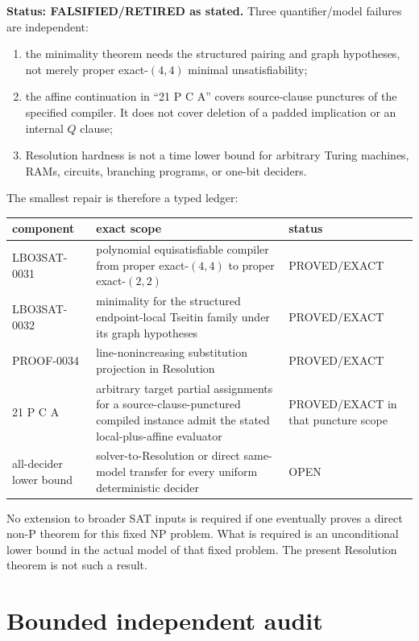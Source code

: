 \documentclass[11pt]{article}
\begin{document}
\medskip
\noindent\textbf{Status: FALSIFIED/RETIRED as stated.}
Three quantifier/model failures are independent:
\begin{enumerate}
  \item the minimality theorem needs the structured pairing and graph
  hypotheses, not merely proper exact-$(4,4)$ minimal unsatisfiability;
  \item the affine continuation in ``21 P C A'' covers source-clause
  punctures of the specified compiler.  It does not cover deletion of a
  padded implication or an internal $Q$ clause;
  \item Resolution hardness is not a time lower bound for arbitrary Turing
  machines, RAMs, circuits, branching programs, or one-bit deciders.
\end{enumerate}

The smallest repair is therefore a typed ledger:
\begin{center}
\begin{tabularx}{\linewidth}{@{}lXl@{}}
\toprule
component & exact scope & status\\
\midrule
LBO3SAT-0031 & polynomial equisatisfiable compiler from proper
exact-$(4,4)$ to proper exact-$(2,2)$ & PROVED/EXACT\\
LBO3SAT-0032 & minimality for the structured endpoint-local Tseitin family
under its graph hypotheses & PROVED/EXACT\\
PROOF-0034 & line-nonincreasing substitution projection in Resolution &
PROVED/EXACT\\
21 P C A & arbitrary target partial assignments for a
source-clause-punctured compiled instance admit the stated local-plus-affine
evaluator & PROVED/EXACT in that puncture scope\\
all-decider lower bound & solver-to-Resolution or direct same-model transfer
for every uniform deterministic decider & OPEN\\
\bottomrule
\end{tabularx}
\end{center}

No extension to broader SAT inputs is required if one eventually proves a
direct non-P theorem for this fixed NP problem.  What is required is an
unconditional lower bound in the actual model of that fixed problem.  The
present Resolution theorem is not such a result.

\section{Bounded independent audit}
\end{document}
